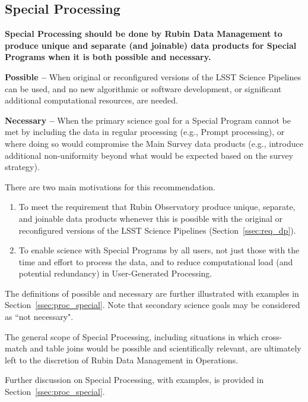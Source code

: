 \subsection{Special Processing}\label{ssec:sci_sproc}

\textbf{Special Processing should be done by Rubin Data Management to 
produce unique and separate (and joinable) data products
for Special Programs when it is both possible and necessary.}

\textbf{Possible -- } When original or reconfigured versions of the LSST
Science Pipelines can be used, and no new algorithmic or software development,
or significant additional computational resources, are needed.

\textbf{Necessary -- } When the primary science goal for a Special Program 
cannot be met by including the data in regular processing (e.g., Prompt processing),
or where doing so would compromise the Main Survey data products (e.g., introduce additional non-uniformity beyond what would be expected based on the survey strategy).

There are two main motivations for this recommendation.

\begin{enumerate}

\item To meet the requirement that Rubin Observatory produce
unique, separate, and joinable data products whenever this is possible 
with the original or reconfigured versions of the LSST Science Pipelines
(Section~\ref{ssec:req_dp}).

\item To enable science with Special Programs by all users, not just those
with the time and effort to process the data, and to reduce computational
load (and potential redundancy) in User-Generated Processing.

\end{enumerate}

The definitions of possible and necessary are further illustrated with examples in Section~\ref{ssec:proc_special}.
Note that secondary science goals may be considered as ``not necessary".

The general scope of Special Processing, including situations in which cross-match and table joins 
would be possible and scientifically relevant, 
are ultimately left to the discretion of Rubin Data Management in Operations.

Further discussion on Special Processing, with examples, is provided in Section~\ref{ssec:proc_special}.

